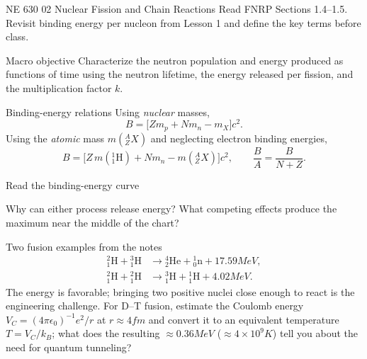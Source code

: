 \HandoutSetup
  {NE 630}
  {02}
  {Nuclear Fission and Chain Reactions}
  {Read FNRP Sections 1.4--1.5. Revisit binding energy per nucleon from Lesson 1 and define the key terms before class.}


\MakeHandoutTitle

\begin{handoutcolumns}

\begin{fixedbox}{Macro objective}
Characterize the neutron population and energy
produced as functions of time using the neutron lifetime, the energy released
per fission, and the multiplication factor $k$.
\end{fixedbox}



\begin{fixedbox}{Binding-energy relations}
Using \emph{nuclear} masses,
\[
 B=\bigl[Zm_p+Nm_n-m_X\bigr]c^2.
\]
Using the \emph{atomic} mass $m({}^{A}_{Z}X)$ and neglecting electron
binding energies,
\[
 B=\bigl[Z\,m({}^{1}_{1}\mathrm H)+Nm_n-m({}^{A}_{Z}X)\bigr]c^2,
 \qquad \frac{B}{A}=\frac{B}{N+Z}.
\]
\end{fixedbox}

\begin{boardbox}{Read the binding-energy curve}
\centering
{}

\RaggedRight
Why can either process release energy? What competing effects produce the
maximum near the middle of the chart?
\end{boardbox}


\begin{fixedbox}{Two fusion examples from the notes}
\begin{align*}
{}^{2}_{1}\mathrm H+{}^{3}_{1}\mathrm H
 &\longrightarrow{}^{4}_{2}\mathrm{He}+{}^{1}_{0}\mathrm n+17.59\unit{MeV},\\
{}^{2}_{1}\mathrm H+{}^{2}_{1}\mathrm H
 &\longrightarrow{}^{3}_{1}\mathrm H+{}^{1}_{1}\mathrm H+4.02\unit{MeV}.
\end{align*}
The energy is favorable; bringing two positive nuclei close enough to react
is the engineering challenge.
For D--T fusion, estimate the Coulomb energy
$V_C=(4\pi\epsilon_0)^{-1}e^2/r$ at $r\approx 4\unit{fm}$ and convert it to an
equivalent temperature $T=V_C/k_B$; what does the
resulting $\approx 0.36\unit{MeV}$ ($\approx 4\times10^9\unit{K}$) tell you about the need for quantum tunneling?
\end{fixedbox}


\end{handoutcolumns}
